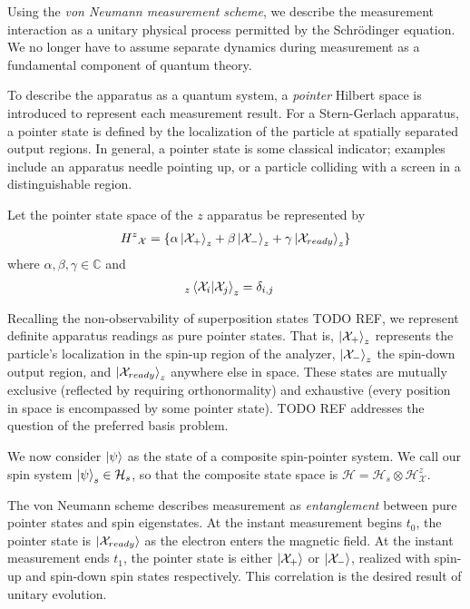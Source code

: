 Using the \textit{von Neumann measurement scheme}, we describe the measurement interaction as a unitary physical process permitted by the Schrödinger equation. We no longer have to assume separate dynamics during measurement as a fundamental component of quantum theory.

To describe the apparatus as a quantum system, a \textit{pointer} Hilbert space is introduced to represent each measurement result. For a Stern-Gerlach apparatus, a pointer state is defined by the localization of the particle at spatially separated output regions. In general, a pointer state is some classical indicator; examples include an apparatus needle pointing up, or a particle colliding with a screen in a distinguishable region.

Let the pointer state space of the $z$ apparatus be represented by
\begin{align}
    {H^z}_\mathcal{X} = \{\alpha \ket{\mathcal{X}_+}_z + \beta \ket{\mathcal{X}_-}_z + \gamma \ket{\mathcal{X}_{ready}}_z\}
\end{align}
where $\alpha, \beta, \gamma \in \mathbb{C}$ and
\begin{align}
    _z\braket{\mathcal{X}_i|\mathcal{X}_j}_z&=\delta_{i,j}
\end{align}

Recalling the non-observability of superposition states TODO REF, we represent definite apparatus readings as pure pointer states. That is, $\ket{\mathcal{X}_+}_z$ represents the particle's localization in the spin-up region of the analyzer, $\ket{\mathcal{X}_-}_z$ the spin-down output region, and $\ket{\mathcal{X}_{ready}}_z$ anywhere else in space. These states are mutually exclusive (reflected by requiring orthonormality) and exhaustive (every position in space is encompassed by some pointer state). TODO REF addresses the question of the preferred basis problem.

We now consider $\ket{\psi}$ as the state of a composite spin-pointer system. We call our spin system $\ket{\psi}_s \in \mathcal{H}_s$, so that the composite state space is $\mathcal{H} = \mathcal{H}_s \otimes \mathcal{H}^z_\mathcal{X}$.

The von Neumann scheme describes measurement as \textit{entanglement} between pure pointer states and spin eigenstates. At the instant measurement begins $t_0$, the pointer state is $\ket{\mathcal{X}_{ready}}$ as the electron enters the magnetic field. At the instant measurement ends $t_1$, the pointer state is either $\ket{\mathcal{X}_{+}}$ or $\ket{\mathcal{X}_{-}}$, realized with spin-up and spin-down spin states respectively. This correlation is the desired result of unitary evolution.

